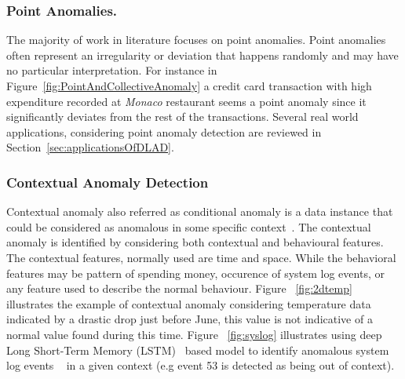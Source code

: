 \subsubsection{Point Anomalies.}
The majority of work in literature focuses on point anomalies. Point anomalies often represent an irregularity or deviation that happens randomly and may have no particular interpretation. For instance in Figure~\ref{fig:PointAndCollectiveAnomaly} a credit card transaction with high expenditure recorded at
\textit{Monaco} restaurant seems a point anomaly since it significantly deviates from the rest of the transactions. Several real world applications, considering point anomaly detection are reviewed in Section~\ref{sec:applicationsOfDLAD}.

\subsubsection{Contextual Anomaly Detection}
\label{sec:contextualanomalies}
Contextual anomaly also referred as conditional anomaly is a data instance that could be considered as anomalous in some specific context~\cite{song2007conditional}. The contextual anomaly is identified by considering both contextual and behavioural features.
The contextual features, normally used are time and space. While the behavioral features may be pattern of spending money, occurence of system log events, or any feature used to describe the normal behaviour.
Figure ~\ref{fig:2dtemp} illustrates the example of contextual anomaly considering temperature data indicated by a drastic drop just before June, this value is not indicative of a normal value found during this time. Figure ~\ref{fig:syslog} illustrates using deep Long Short-Term Memory (LSTM)~\cite{hochreiter1997long}  based model to identify anomalous system log events ~\cite{du2017deeplog} in a given context (e.g event 53 is detected as being out of context).



